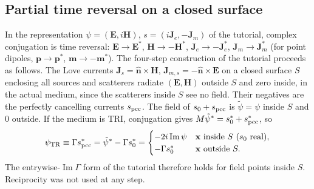 \documentclass[11pt,letterpaper]{article}
\newcommand{\vect}[1]{\mathbf{#1}}
\newcommand{\Ev}{\vect{E}}
\newcommand{\Hv}{\vect{H}}
\newcommand{\Jv}{\vect{J}}
\newcommand{\xv}{\vect{x}}
\newcommand{\pv}{\vect{p}}
\newcommand{\mv}{\vect{m}}
\newcommand{\nhat}{\hat{\vect{n}}}
\renewcommand{\Im}{\operatorname{Im}}
\begin{document}
\subsection{Partial time reversal on a closed surface}\label{sec:TR}
In the representation $\psi=(\Ev,i\Hv)$, $s=(i\Jv_e,-\Jv_m)$ of the tutorial, complex conjugation is time reversal: $\Ev\to\Ev^*$, $\Hv\to-\Hv^*$, $\Jv_e\to-\Jv_e^*$, $\Jv_m\to\Jv_m^*$ (for point dipoles, $\pv\to\pv^*$, $\mv\to-\mv^*$). The four-step construction of the tutorial proceeds as follows. The Love currents $\Jv_s=\nhat\times\Hv$, $\Jv_{m,s}=-\nhat\times\Ev$ on a closed surface $S$ enclosing all sources and scatterers radiate $(\Ev,\Hv)$ outside $S$ and zero inside, in the actual medium, since the scatterers inside $S$ see no field. Their negatives are the perfectly cancelling currents $s_{\rm pcc}$. The field of $s_0+s_{\rm pcc}$ is $\tilde\psi=\psi$ inside $S$ and $0$ outside. If the medium is TRI, conjugation gives $M\tilde\psi^*=s_0^*+s_{\rm pcc}^*$, so
\begin{align}
    \psi_{\rm TR}\equiv\Gamma s_{\rm pcc}^*=\tilde\psi^*-\Gamma s_0^*=
    \begin{cases}-2i\Im\psi & \xv\text{ inside }S\ (s_0\text{ real}),\\ -\Gamma s_0^* & \xv\text{ outside }S.\end{cases}
\end{align}
The entrywise-$\Im\Gamma$ form of the tutorial therefore holds for field points inside $S$. Reciprocity was not used at any step.
\end{document}
